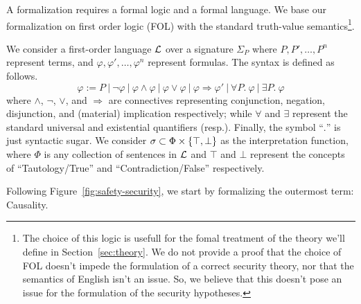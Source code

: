 A formalization requires a formal logic and a formal language.  We base our
formalization on first order logic (FOL) with the standard truth-value
semantics\footnote{The choice of this logic is usefull for the fomal treatment of the
theory we'll define in Section~\ref{sec:theory}.  We do not provide a proof
that the choice of FOL doesn't impede the formulation of a correct security
theory, nor that the semantics of English isn't an issue. So, we believe that
this doesn't pose an issue for the formulation of the security hypotheses.}.

We consider a first-order language $\mathcal{L}$ over a
signature $\Sigma_P$ where $P,P',\ldots,P^n$ represent terms, and
$\varphi,\varphi',\ldots,\varphi^n$ represent formulas.
The syntax is defined as follows.
\begin{displaymath}
	\varphi := P~|~\neg\varphi~|~\varphi\wedge\varphi~|~\varphi\vee\varphi~|~\varphi\Rightarrow\varphi'~|~\forall P.~\varphi~|~\exists P.~\varphi
\end{displaymath}
where $\wedge$, $\neg$, $\vee$, and $\Rightarrow$ are connectives representing
conjunction, negation, disjunction, and (material) implication respectively;
while $\forall$ and $\exists$ represent the standard universal and existential
quantifiers (resp.). Finally, the symbol ``$.$'' is just syntactic sugar.  We
consider $\sigma\subset\Phi\times\{\top,\bot\}$ as the interpretation
function, where $\Phi$ is any collection of sentences in $\mathcal{L}$ and $\top$
and $\bot$ represent the concepts of ``Tautology/True'' and
``Contradiction/False'' respectively.


Following Figure~\ref{fig:safety-security}, we start by formalizing the outermost term: Causality.

